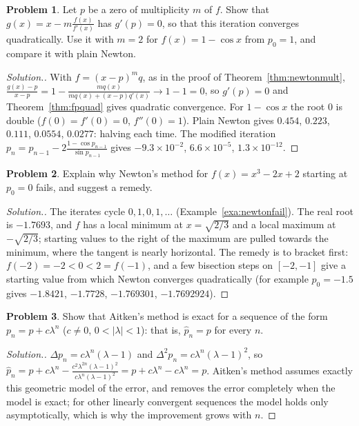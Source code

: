 \documentclass[11pt,a4paper]{article}
\numberwithin{equation}{section}
\theoremstyle{definition}
\newtheorem{problemx}{Problem}[subsection]
\newenvironment{problem}{\begin{problemx}}{\end{problemx}}
\newenvironment{solution}
  {\renewcommand{\qedsymbol}{}\begin{proof}[\textit{Solution}.]}
  {\end{proof}}
\begin{document}
\begin{problem}
\label{prob:mnewton}
Let $p$ be a zero of multiplicity $m$ of $f$. Show that $g(x) = x-m\frac{f(x)}{f'(x)}$ has $g'(p) = 0$, so that this iteration converges
quadratically. Use it with $m = 2$ for $f(x) = 1-\cos x$ from $p_0 = 1$, and compare it with plain Newton.
\end{problem}
\begin{solution}
With $f = (x-p)^mq$, as in the proof of Theorem~\ref{thm:newtonmult}, $\frac{g(x)-p}{x-p} = 1-\frac{mq(x)}{mq(x)+(x-p)q'(x)}\longrightarrow1-1 = 0$,
so $g'(p) = 0$ and Theorem~\ref{thm:fpquad} gives quadratic convergence. For $1-\cos x$ the root $0$ is double ($f(0) = f'(0) = 0$,
$f''(0) = 1$). Plain Newton gives $0.454$, $0.223$, $0.111$, $0.0554$, $0.0277$: halving each time. The modified iteration
$p_n = p_{n-1}-2\frac{1-\cos p_{n-1}}{\sin p_{n-1}}$ gives $-9.3\times10^{-2}$, $6.6\times10^{-5}$, $1.3\times10^{-12}$.
\end{solution}

\begin{problem}
Explain why Newton's method for $f(x) = x^3-2x+2$ starting at $p_0 = 0$ fails, and suggest a remedy.
\end{problem}
\begin{solution}
The iterates cycle $0, 1, 0, 1,\dots$ (Example~\ref{exa:newtonfail}). The real root is $-1.7693$, and $f$ has a local minimum at
$x = \sqrt{2/3}$ and a local maximum at $-\sqrt{2/3}$; starting values to the right of the maximum are pulled towards the minimum, where the
tangent is nearly horizontal. The remedy is to bracket first: $f(-2) = -2<0<2 = f(-1)$, and a few bisection steps on $[-2,-1]$ give a
starting value from which Newton converges quadratically (for example $p_0 = -1.5$ gives $-1.8421$, $-1.7728$, $-1.769301$, $-1.7692924$).
\end{solution}

\begin{problem}
Show that Aitken's method is exact for a sequence of the form $p_n = p+c\lambda^n$ ($c\neq0$, $0<|\lambda|<1$): that is, $\hat p_n = p$ for
every $n$.
\end{problem}
\begin{solution}
$\Delta p_n = c\lambda^n(\lambda-1)$ and $\Delta^2p_n = c\lambda^n(\lambda-1)^2$, so
$\hat p_n = p+c\lambda^n-\frac{c^2\lambda^{2n}(\lambda-1)^2}{c\lambda^n(\lambda-1)^2} = p+c\lambda^n-c\lambda^n = p$. Aitken's method assumes
exactly this geometric model of the error, and removes the error completely when the model is exact; for other linearly convergent
sequences the model holds only asymptotically, which is why the improvement grows with $n$.
\end{solution}
\end{document}
